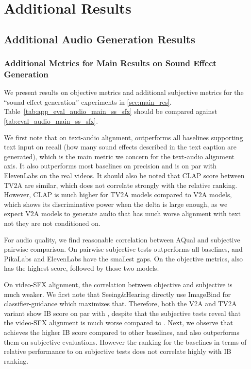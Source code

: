 \section{Additional Results}

\subsection{Additional Audio Generation Results}

\subsubsection{Additional Metrics for Main Results on Sound Effect Generation}\label{sec:app_audio_main_sfx}
We present results on objective metrics and additional subjective metrics for the ``sound effect generation'' experiments in \ref{sec:main_res}.
Table~\ref{tab:app_eval_audio_main_ss_sfx} should be compared against \cref{tab:eval_audio_main_ss_sfx}.



We first note that on text-audio alignment, \OursAudio outperforms all baselines supporting text input on recall (how many sound effects described in the text caption are generated),
which is the main metric we concern for the text-audio alignment axis. It also outperforms most baselines on precision and is on par with ElevenLabs on the real videos.
It should also be noted that CLAP score between TV2A are similar, which does not correlate strongly with the relative ranking.
However, CLAP is much higher for TV2A models compared to V2A models,
which shows its discriminative power when the delta is large enough,
as we expect V2A models to generate audio that has much worse alignment with text not they are not conditioned on.

For audio quality, we find reasonable correlation between AQual and subjective pairwise comparison.
On pairwise subjective tests \OursAudio outperforms all baselines,
and PikaLabs and ElevenLabs have the smallest gaps.
On the objective metrics, \OursAudio also has the highest score, followed by those two models.

On video-SFX alignment, the correlation between objective and subjective is much weaker.
We first note that Seeing\&Hearing directly use ImageBind for classifier-guidance which maximizes that.
Therefore, both the V2A and TV2A variant show IB score on par with \OursAudio, despite that the subjective tests reveal that the video-SFX alignment is much worse compared to \OursAudio.
Next, we observe that \OursAudio achieves the higher IB score compared to other baselines, and also outperforms them on subjective evaluations.
However the ranking for the baselines in terms of relative performance to \OursAudio on subjective tests does not correlate highly with IB ranking.

